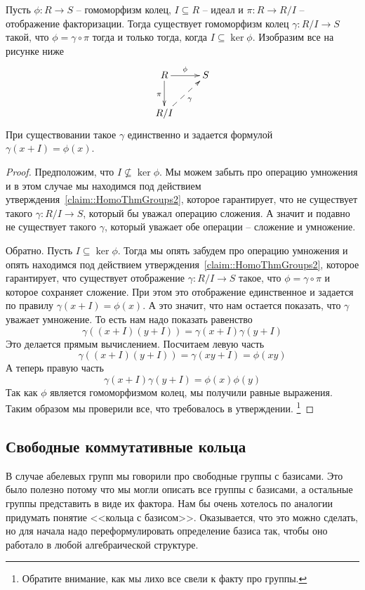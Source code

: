 \begin{claim}
\label{claim::RingSecondHom}
Пусть $\phi\colon R\to S$ -- гомоморфизм колец, $I\subseteq R$ -- идеал и $\pi \colon R\to R/I$ -- отображение факторизации.
Тогда существует гомоморфизм колец $\gamma \colon R/I \to S$ такой, что $\phi = \gamma \circ \pi$ тогда и только тогда, когда $I 
\subseteq \ker \phi$.
Изобразим все на рисунке ниже
\[
\xymatrix{
	{R}\ar[r]^{\phi}\ar[d]_{\pi}&{S}\\
	{R/I}\ar@{-->}[ru]_{\gamma}&{}
}
\]
При существовании такое $\gamma$ единственно и задается формулой $\gamma(x + I) = \phi(x)$.
\end{claim}
\begin{proof}
Предположим, что $I\not\subseteq \ker \phi$.
Мы можем забыть про операцию умножения и в этом случае мы находимся под действием утверждения~\ref{claim::HomoThmGroups2}, которое гарантирует, что не существует такого $\gamma\colon R/I\to S$, который бы уважал операцию сложения.
А значит и подавно не существует такого $\gamma$, который уважает обе операции -- сложение и умножение.

Обратно.
Пусть $I\subseteq \ker \phi$.
Тогда мы опять забудем про операцию умножения и опять находимся под действием утверждения~\ref{claim::HomoThmGroups2}, которое гарантирует, что существует отображение $\gamma \colon R/I \to S$ такое, что $\phi = \gamma\circ \pi$ и которое сохраняет сложение.
При этом это отображение единственное и задается по правилу $\gamma(x + I) = \phi(x)$.
А это значит, что нам остается показать, что $\gamma$ уважает умножение.
То есть нам надо показать равенство
\[
\gamma((x+I) (y+I)) = \gamma(x + I) \gamma(y + I)
\]
Это делается прямым вычислением.
Посчитаем левую часть
\[
\gamma((x+I) (y+I)) = \gamma(xy + I) = \phi(xy)
\]
А теперь правую часть
\[
\gamma(x + I) \gamma(y + I) = \phi(x) \phi(y)
\]
Так как $\phi$ является гомоморфизмом колец, мы получили равные выражения.
Таким образом мы проверили все, что требовалось в утверждении.%
\footnote{Обратите внимание, как мы лихо все свели к факту про группы.}
\end{proof}

\subsection{Свободные коммутативные кольца}

В случае абелевых групп мы говорили про свободные группы с базисами.
Это было полезно потому что мы могли описать все группы с базисами, а остальные группы представить в виде их фактора.
Нам бы очень хотелось по аналогии придумать понятие <<кольца с базисом>>.
Оказывается, что это можно сделать, но для начала надо переформулировать определение базиса так, чтобы оно работало в любой алгебраической структуре.

